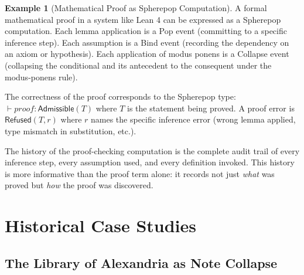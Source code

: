 \documentclass[12pt, a4paper, openany]{book}
\theoremstyle{plain}
\theoremstyle{definition}
\newtheorem{example}[theorem]{Example}
\theoremstyle{remark}
\newcommand{\Adm}{\mathsf{Admissible}}
\newcommand{\Rfsd}{\mathsf{Refused}}
\begin{document}
\begin{example}[Mathematical Proof as Spherepop Computation]
A formal mathematical proof in a system like Lean 4 can be expressed as a
Spherepop computation. Each lemma application is a Pop event (committing to
a specific inference step). Each assumption is a Bind event (recording the
dependency on an axiom or hypothesis). Each application of modus ponens is a
Collapse event (collapsing the conditional and its antecedent to the consequent
under the modus-ponens rule).

The correctness of the proof corresponds to the Spherepop type:
$\vdash \mathit{proof} : \Adm(T)$ where $T$ is the statement being proved.
A proof error is $\Rfsd(T, r)$ where $r$ names the specific inference error
(wrong lemma applied, type mismatch in substitution, etc.).

The history of the proof-checking computation is the complete audit trail of
every inference step, every assumption used, and every definition invoked.
This history is more informative than the proof term alone: it records not
just \emph{what} was proved but \emph{how} the proof was discovered.
\end{example}

\chapter{Historical Case Studies}

\section{The Library of Alexandria as Note Collapse}
\end{document}

